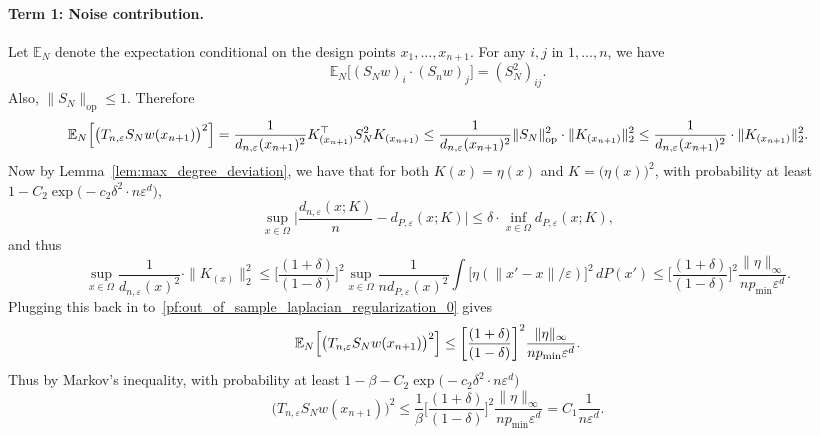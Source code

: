 \documentclass{article}
\newcommand{\1}{\mathbf{1}}
\newcommand{\Ebb}{\mathbb{E}}
\theoremstyle{alden}
\theoremstyle{aldenthm}
\theoremstyle{definition}
\theoremstyle{remark}
\begin{document}
\paragraph{Term 1: Noise contribution.}
Let $\Ebb_N$ denote the expectation conditional on the design points $x_1,\ldots,x_{n + 1}$. For any $i,j$ in $1,\ldots,n$, we have
\begin{equation*}
\Ebb_N\bigl[(S_Nw)_i \cdot (S_nw)_j\bigr] = (S_N^2)_{ij}.
\end{equation*}
Also, $\|S_N\|_{\textrm{op}} \leq 1$. 
Therefore
\begin{equation}
\label{pf:out_of_sample_laplacian_regularization_0}
\Ebb_N\Bigl[\bigl(T_{n,\varepsilon}S_Nw(x_{n + 1})\bigr)^2\Bigr] = \frac{1}{d_{n,\varepsilon}(x_{n + 1})^2} K_{(x_{n + 1})}^{\top} S_N^2 K_{(x_{n + 1})} \leq \frac{1}{d_{n,\varepsilon}(x_{n + 1})^2} \|S_N\|_{\textrm{op}}^2 \cdot \|K_{(x_{n + 1})}\|_2^2 \leq \frac{1}{d_{n,\varepsilon}(x_{n + 1})^2} \cdot \|K_{(x_{n + 1})}\|_2^2.
\end{equation}
Now by Lemma~\ref{lem:max_degree_deviation}, we have that for both $K(x) = \eta(x)$ and $K = \bigl(\eta(x)\bigr)^2$, with probability at least $1 - C_2\exp\bigl(-c_2 \delta^2 \cdot n \varepsilon^d\bigr)$,
\begin{equation}
\label{pf:out_of_sample_laplacian_regularization_1}
\sup_{x \in \Omega} \biggl|\frac{d_{n,\varepsilon}(x; K)}{n} - d_{P,\varepsilon}(x; K)\biggr| \leq \delta \cdot \inf_{x \in \Omega} d_{P,\varepsilon}(x; K),
\end{equation}
and thus
\begin{equation*}
\sup_{x \in \Omega}\frac{1}{d_{n,\varepsilon}(x)^2} \cdot \|K_{(x)}\|_2^2 \leq \biggl[\frac{(1 + \delta)}{(1 - \delta)}\biggr]^2 \sup_{x \in \Omega} \frac{1}{nd_{P,\varepsilon}(x)^2} \int \bigl[\eta(\|x'-x\|/\varepsilon)\bigr]^2 \,dP(x') \leq \biggl[\frac{(1 + \delta)}{(1 - \delta)}\biggr]^2 \frac{\|\eta\|_{\infty}}{n p_{\min} \varepsilon^d}.
\end{equation*}
Plugging this back in to~\eqref{pf:out_of_sample_laplacian_regularization_0} gives
\begin{equation*}
\Ebb_N\Bigl[\bigl(T_{n,\varepsilon}S_Nw(x_{n + 1})\bigr)^2\Bigr] \leq \biggl[\frac{(1 + \delta)}{(1 - \delta)}\biggr]^2 \frac{\|\eta\|_{\infty}}{n p_{\min} \varepsilon^d}.
\end{equation*}
Thus by Markov's inequality, with probability at least $1 - \beta - C_2\exp\bigl(-c_2 \delta^2 \cdot n \varepsilon^d\bigr)$
\begin{equation*}
\bigl(T_{n,\varepsilon}S_Nw(x_{n + 1})\bigr)^2 \leq \frac{1}{\beta}\biggl[\frac{(1 + \delta)}{(1 - \delta)}\biggr]^2 \frac{\|\eta\|_{\infty}}{n p_{\min} \varepsilon^d} = C_1\frac{1}{n\varepsilon^d}.
\end{equation*}
\end{document}
